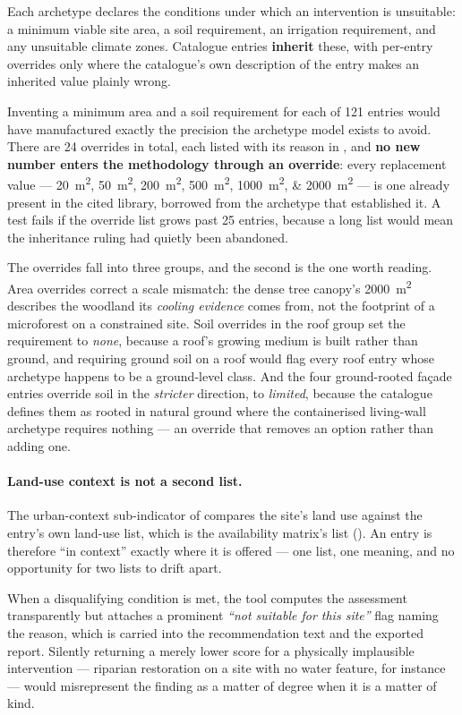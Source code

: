 Each archetype declares the conditions under which an intervention is
unsuitable: a minimum viable site area, a soil requirement, an irrigation
requirement, and any unsuitable climate zones. Catalogue entries
\textbf{inherit} these, with per-entry overrides only where the catalogue's own
description of the entry makes an inherited value plainly wrong.

Inventing a minimum area and a soil requirement for each of \num{121} entries
would have manufactured exactly the precision the archetype model exists to
avoid. There are \num{24} overrides in total, each listed with its reason in
, and \textbf{no new number enters the methodology through
an override}: every replacement value --- \qtylist{20;50;200;500;1000;2000}
{\metre\squared} --- is one already present in the cited library, borrowed from
the archetype that established it. A test fails if the override list grows past
\num{25} entries, because a long list would mean the inheritance ruling had
quietly been abandoned.

The overrides fall into three groups, and the second is the one worth reading.
Area overrides correct a scale mismatch: the dense tree canopy's
\qty{2000}{\metre\squared} describes the woodland its \emph{cooling evidence}
comes from, not the footprint of a microforest on a constrained site. Soil
overrides in the roof group set the requirement to \emph{none}, because a roof's
growing medium is built rather than ground, and requiring ground soil on a roof
would flag every roof entry whose archetype happens to be a ground-level class.
And the four ground-rooted fa\c{c}ade entries override soil in the
\emph{stricter} direction, to \emph{limited}, because the catalogue defines them
as rooted in natural ground where the containerised living-wall archetype
requires nothing --- an override that removes an option rather than adding one.

\paragraph{Land-use context is not a second list.} The urban-context
sub-indicator of  compares the site's land use
against the entry's own land-use list, which is the availability matrix's list
(). An entry is therefore ``in context'' exactly where it
is offered --- one list, one meaning, and no opportunity for two lists to drift
apart.

When a disqualifying condition is met, the tool computes the assessment
transparently but attaches a prominent \emph{``not suitable for this site''}
flag naming the reason, which is carried into the recommendation text and the
exported report. Silently returning a merely lower score for a physically
implausible intervention --- riparian restoration on a site with no water
feature, for instance --- would misrepresent the finding as a matter of degree
when it is a matter of kind.

